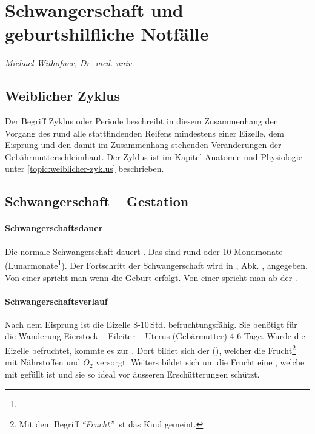 \clearpage
\section{Schwangerschaft und geburtshilfliche Notfälle}
{\mdseries\itshape
Michael Withofner, Dr. med. univ.}

\subsection{Weiblicher Zyklus}

Der Begriff Zyklus oder Periode beschreibt in diesem Zusammenhang den Vorgang
des rund alle  stattfindenden Reifens
mindestens einer Eizelle, dem Eisprung und den damit im Zusammenhang stehenden Veränderungen der
Gebährmutterschleimhaut. Der Zyklus ist im Kapitel Anatomie und Physiologie
unter \ref{topic:weiblicher-zyklus} beschrieben.








\subsection{Schwangerschaft -- Gestation}

\paragraph{Schwangerschaftsdauer} Die normale
Schwangerschaft dauert . Das sind rund
 oder 10 Mondmonate
(Lunarmonate\footnote{}). Der
Fortschritt der Schwangerschaft wird in
, Abk. , angegeben. Von
einer  spricht man wenn die Geburt
erfolgt. Von einer  spricht man ab der
.

\paragraph{Schwangerschaftsverlauf} Nach dem Eisprung ist die Eizelle 8-10\,Std.
befruchtungsfähig. Sie benötigt für die Wanderung Eierstock -- Eileiter --
Uterus (Gebärmutter) 4-6 Tage. Wurde die Eizelle befruchtet, kommte es zur
. Dort bildet
sich der  (), welcher die
Frucht\footnote{Mit dem Begriff \emph{"`Frucht"'} ist das
Kind gemeint.} mit Nährstoffen und $O_2$ versorgt. Weiters
bildet sich um die Frucht eine , welche mit  gefüllt ist und sie so ideal vor äusseren
Erschütterungen schützt.

